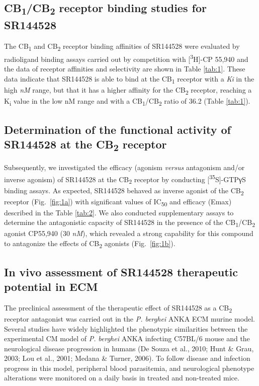 \documentclass[empirical, authordate, issue]{jote-new-article}
\begin{document}
\subsection{CB\textsubscript{1}/CB\textsubscript{2} receptor binding studies for SR144528}

The CB\textsubscript{1} and CB\textsubscript{2} receptor binding affinities of SR144528 were evaluated by radioligand binding assays carried out by competition with [\textsuperscript{3}H]-CP 55,940 and the data of receptor affinities and selectivity are shown in Table \ref{tab:1}. These data indicate that SR144528 is able to bind at the CB\textsubscript{1} receptor with a \emph{Ki} in the high \emph{nM} range, but that it has a higher affinity for the CB\textsubscript{2} receptor, reaching a K\textsubscript{i} value in the low nM range and with a CB\textsubscript{1}/CB\textsubscript{2} ratio of 36.2 (Table \ref{tab:1}).






\subsection{Determination of the functional activity of SR144528 at the CB\textsubscript{2} receptor}

Subsequently, we investigated the efficacy (agonism \emph{versus} antagonism and/or inverse agonism) of SR144528 at the CB\textsubscript{2 }receptor by conducting [\textsuperscript{35}S]-GTPγS binding assays. As expected, SR144528 behaved as inverse agonist of the CB\textsubscript{2} receptor (Fig.~\ref{fig:1a}) with significant values of IC\textsubscript{50} and efficacy (Emax) described in the Table \ref{tab:2}. We also conducted supplementary assays to determine the antagonistic capacity of SR144528 in the presence of the CB\textsubscript{1}/CB\textsubscript{2} agonist CP55,940 (30 \emph{nM}), which revealed a strong capability for this compound to antagonize the effects of CB\textsubscript{2} agonists (Fig.~\ref{fig:1b}).


\subsection{In vivo assessment of SR144528 therapeutic potential in ECM}




The preclinical assessment of the therapeutic effect of SR144528 as a CB\textsubscript{2} receptor antagonist was carried out in the \emph{P. berghei }ANKA ECM murine model. Several studies have widely highlighted the phenotypic similarities between the experimental CM model of \emph{P. }\emph{berghei}\emph{ }ANKA infecting C57BL/6 mouse and the neurological disease progression in humans (De Souza et al., 2010; Hunt \& Grau, 2003; Lou et al., 2001; Medana \& Turner, 2006). To follow disease and infection progress in this model, peripheral blood parasitemia, and neurological phenotype alterations were monitored on a daily basis in treated and non-treated mice.
\end{document}

